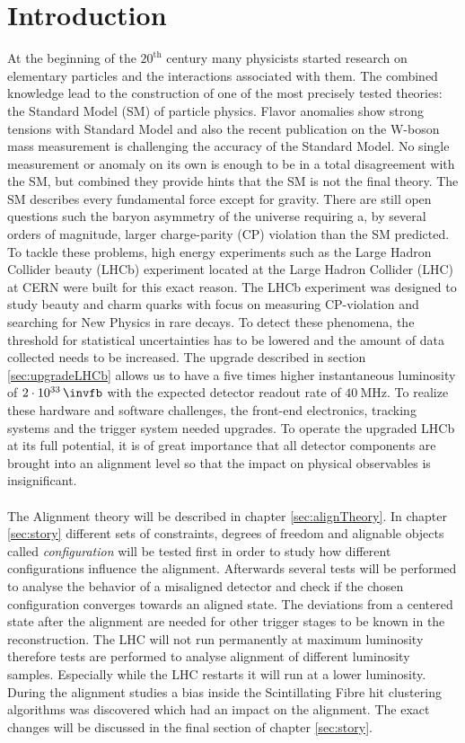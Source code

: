 \chapter{Introduction}
\label{sec:einleitung}

At the beginning of the $20^{\text{th}}$ century many physicists started research on
elementary particles and the interactions associated with them. The combined
knowledge lead to the construction of one of the most precisely tested theories: the Standard Model (SM) of particle physics.
Flavor anomalies show strong tensions with Standard Model and also the recent publication on the W-boson mass measurement is challenging the accuracy of the Standard Model\cite{wmass}.
No single measurement or anomaly on its own is enough to be in a total disagreement with the SM, but combined they provide hints that the SM is not the final theory.
The SM describes every fundamental force except for gravity. There are still open questions such the baryon asymmetry of the universe requiring a, by several orders of magnitude, larger charge-parity (CP) violation than the SM predicted.
To tackle these problems, high energy experiments such as the Large Hadron Collider beauty (LHCb) experiment located at the Large Hadron Collider (LHC) at CERN were built for this exact reason.
The LHCb experiment was designed to study beauty and charm quarks with focus on measuring CP-violation and searching for New Physics in rare decays.
To detect these phenomena, the threshold for statistical uncertainties has to
be lowered and the amount of data collected needs to be increased. The upgrade described in section \ref{sec:upgradeLHCb} allows us to have a five times higher instantaneous luminosity of $\SI{2e33}{\invfb}$ with the expected detector readout rate of $\SI{40}{\mega\hertz}$. To realize these hardware and software challenges, the front-end electronics, tracking systems and the trigger system needed upgrades.
To operate the upgraded LHCb at its full potential, it is of great importance that all detector components are brought into an alignment level so that the impact on physical observables is insignificant.
\\
\\
The Alignment theory will be described in chapter \ref{sec:alignTheory}. In chapter \ref{sec:story} different sets of constraints, degrees of freedom
and alignable objects called \textit{configuration} will be tested first in order
to study how different configurations influence the alignment. Afterwards several
tests will be performed to analyse the behavior of a misaligned detector and check
if the chosen configuration converges towards an aligned state.
The deviations from a centered state after the alignment are needed for other trigger stages to be known in the reconstruction.
The LHC will not run permanently at maximum luminosity therefore tests are performed to analyse alignment of different luminosity samples. Especially while the LHC restarts it will run at a lower luminosity.
During the alignment studies a bias inside the Scintillating Fibre hit clustering algorithms was discovered which had an impact on the alignment. The exact changes will be discussed in the final section of chapter \ref{sec:story}.
